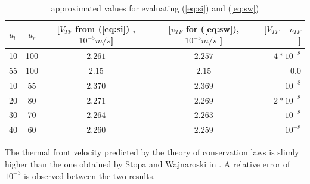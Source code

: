 \begin{table}[H]
	\begin{center}
		\begin{tabular}{|l|c|c|c|r|}
		\hline
			$u_{l}$ & $u_{r}$ & [$V_{TF}$ from (\ref{eq:si}) ,$10^{-5}m/s$]& [$v_{TF}$ for (\ref{eq:sw}), $10^{-5}m/s$ ]&[$V_{TF}-v_{TF}$]  \\ \hline
			10 & 100 & $2.261$ & $2.257$  & $4*10^{-8}$   \\ 
			55 & 100 & $2.15$  & $2.15$       & $0.0  $    \\ 
			10 & 55 & $2.370$   & $2.369$    & $10^{-8}$  \\ 
			20 & 80 & $2.271$    & $2.269$  & $2*10^{-8} $ \\ 
			30 & 70 & $2.264$    & $2.263$    & $10^{-8} $ \\ 
			40 & 60 & $2.260$       &  $2.259$  & $10^{-8} $\\
			\hline
		\end{tabular}
		\caption{approximated values for evaluating (\ref{eq:si}) and (\ref{eq:sw})}
		\label{tab:ap}
	\end{center}
\end{table}
The thermal front velocity predicted by the theory of conservation laws is slimly higher than the one obtained by Stopa and Wajnaroski in \cite{Waj05}. A relative error of $10^{-3}$ is observed between the two results. 



